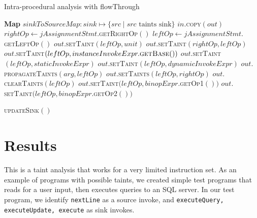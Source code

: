 \documentclass[acmsmall]{acmart}
\begin{document}
\begin{algorithm}
  \caption{Intra-procedural analysis with flowThrough}
  \label{alg1}
\begin{algorithmic}[1]
  \State \textbf{Map} $sinkToSourceMap:sink \mapsto \{src \mid src \text{ taints sink}\}$
    \State $in.$\textsc{copy}$(out)$ 
     
      \State $rightOp \gets jAssignmentStmt.$\textsc{getRightOp}$()$
      \State $leftOp \gets jAssignmentStmt.$\textsc{getLeftOp}$()$
        \State $out.$\textsc{setTaint}$(leftOp,unit)$ 
      \EndIf
       
        \State $out.$\textsc{setTaint}$(rightOp,leftOp)$
      \EndIf
       
          \State $out.$\textsc{setTaint}$(leftOp,instanceInvokeExpr.\textsc{getBase}())$
        \EndIf
          \State $out.$\textsc{setTaint}$(leftOp,staticInvokeExpr)$
        \EndIf
          \State $out.$\textsc{setTaint}$(leftOp,dynamicInvokeExpr)$
        \EndIf
         
          \State $out.$\textsc{propagateTaints}$(arg,leftOp)$
        \EndFor
      \EndIf
        \State $out.$\textsc{setTaints}$(leftOp,rightOp)$
      \EndIf
        \State $out.$\textsc{clearTaints}$(leftOp)$
        \State $out.$\textsc{setTaint}$(leftOp,binopExpr.$\textsc{getOp1}$())$
        \State $out.$\textsc{setTaint}$(leftOp,binopExpr.$\textsc{getOp2}$())$
        
      \EndIf
    \EndIf

    \State \textsc{updateSink}$()$ 
  \EndProcedure
\end{algorithmic}
\end{algorithm}
\pagebreak
\section{Results}
This is a taint analysis that works for a very limited instruction set. As an example of programs with possible taints, we created simple test programs that reads for a user input, then executes queries to an SQL server. In our test program, we identify \texttt{nextLine} as a source invoke, and \texttt{executeQuery, executeUpdate, execute} as sink invokes.
\end{document}
